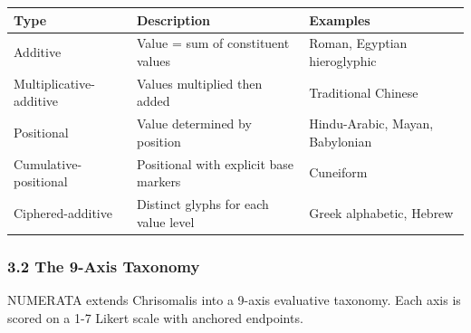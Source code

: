 \documentclass[
]{article}
\newcounter{none} %
\begin{document}
{\def\LTcaptype{none} %
\begin{longtable}[]{@{}
  >{\raggedright\arraybackslash}p{}
  >{\raggedright\arraybackslash}p{}
  >{\raggedright\arraybackslash}p{}@{}}
\toprule\noalign{}
\begin{minipage}[b]{\linewidth}\raggedright
Type
\end{minipage} & \begin{minipage}[b]{\linewidth}\raggedright
Description
\end{minipage} & \begin{minipage}[b]{\linewidth}\raggedright
Examples
\end{minipage} \\
\midrule\noalign{}
\endhead
\bottomrule\noalign{}
\endlastfoot
Additive & Value = sum of constituent values & Roman, Egyptian
hieroglyphic \\
Multiplicative-additive & Values multiplied then added & Traditional
Chinese \\
Positional & Value determined by position & Hindu-Arabic, Mayan,
Babylonian \\
Cumulative-positional & Positional with explicit base markers &
Cuneiform \\
Ciphered-additive & Distinct glyphs for each value level & Greek
alphabetic, Hebrew \\
\end{longtable}
}

\subsubsection{3.2 The 9-Axis Taxonomy}\label{the-9-axis-taxonomy}

NUMERATA extends Chrisomalis into a 9-axis evaluative taxonomy. Each
axis is scored on a 1-7 Likert scale with anchored endpoints.
\end{document}
